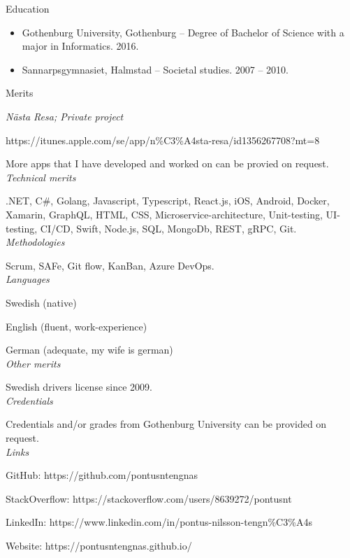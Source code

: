 \vspace{12px}

{\itshape\Large\begin{center}
Education
\end{center}}

\vspace{12px}

\begin{itemize}
  \item Gothenburg University, Gothenburg – Degree of Bachelor of Science with a major in Informatics. 2016.

  \item Sannarpsgymnasiet, Halmstad – Societal studies. 2007 – 2010.
\end{itemize}

\newpage

{\itshape\Large\begin{center}
Merits
\end{center}}

\vspace{12px}

{\itshape Nästa Resa; Private project}

https://itunes.apple.com/se/app/n\%C3\%A4sta-resa/id1356267708?mt=8

More apps that I have developed and worked on can be provied on request.\\

{\itshape Technical merits}

.NET, C\#, Golang, Javascript, Typescript, React.js, iOS, Android, Docker, Xamarin, GraphQL, HTML,
CSS, Microservice-architecture, Unit-testing, UI-testing, CI/CD, Swift, Node.js, SQL, MongoDb, REST, gRPC, Git.\\

{\itshape Methodologies}

Scrum, SAFe, Git flow, KanBan, Azure DevOps.\\

{\itshape Languages}

Swedish (native)

English (fluent, work-experience)

German (adequate, my wife is german)\\

{\itshape Other merits}

Swedish drivers license since 2009.\\

{\itshape Credentials}

Credentials and/or grades from Gothenburg University can be provided on request.\\

{\itshape Links}

GitHub: https://github.com/pontusntengnas

StackOverflow: https://stackoverflow.com/users/8639272/pontusnt

LinkedIn: https://www.linkedin.com/in/pontus-nilsson-tengn\%C3\%A4s

Website: https://pontusntengnas.github.io/
